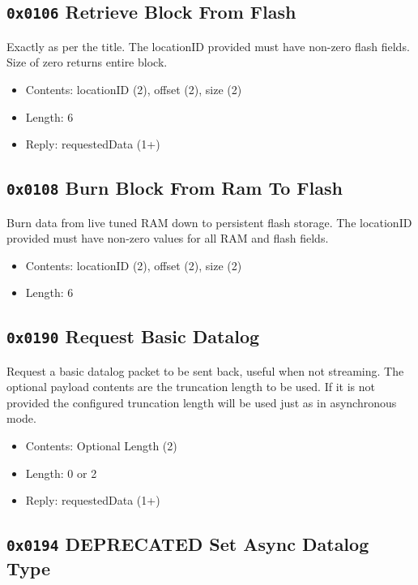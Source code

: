 \documentclass[12pt,a4paper,titlepage]{article}
\begin{document}
\begin{titlepage}
\begin{center}
\newpage
\subsection{\texttt{0x0106} Retrieve Block From Flash}

Exactly as per the title. The locationID provided must have non-zero flash fields. Size of zero returns entire block.

\begin{itemize}
\item Contents: locationID (2),  offset (2), size (2)
\item Length: 6
\item Reply: requestedData (1+)
\end{itemize}


\subsection{\texttt{0x0108} Burn Block From Ram To Flash}

Burn data from live tuned RAM down to persistent flash storage. The locationID provided must have non-zero values for all RAM and flash fields.

\begin{itemize}
\item Contents: locationID (2),  offset (2), size (2)
\item Length: 6
\end{itemize}


\subsection{\texttt{0x0190} Request Basic Datalog}

Request a basic datalog packet to be sent back, useful when not streaming. The optional payload contents are the truncation length to be used. If it is not provided the configured truncation length will be used just as in asynchronous mode.

\begin{itemize}
\item Contents: Optional Length (2)
\item Length: 0 or 2
\item Reply: requestedData (1+)
\end{itemize}


\subsection{\texttt{0x0194} DEPRECATED Set Async Datalog Type}


\end{center}
\end{titlepage}
\end{document}
